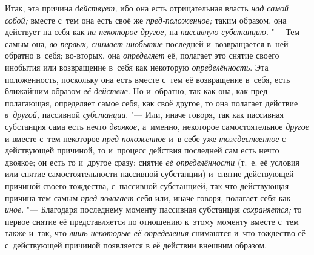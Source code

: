 Итак, эта причина {\em действует,} ибо она есть отрицательная власть
{\em над самой собой;} вместе с~тем она есть своё же {\em пред-положенное;}
таким образом, она действует на себя как {\em на некоторое другое,} на
{\em пассивную субстанцию}. "--- Тем самым она,
{\em во-первых, снимает инобытие} последней и~возвращается в~ней обратно
в~себя; во-вторых, она {\em определяет} её, полагает это снятие своего инобытия
или возвращение в~себя как некоторую {\em определённость}. Эта положенность,
поскольку она есть вместе с~тем её возвращение в~себя, есть ближайшим образом
{\em её действие}. Но и~обратно, так как она, как пред-полагающая, определяет
самое себя, как своё другое, то она полагает действие {\em в~другой,} пассивной
{\em субстанции}. "--- Или, иначе говоря, так как пассивная субстанция сама
есть нечто {\em двоякое,} а~именно, некоторое самостоятельное {\em другое} и
вместе с~тем некоторое {\em пред-положенное} и~в себе уже {\em тождественное}
с действующей причиной, то и~процесс действия последней сам есть нечто двоякое;
он есть то и~другое сразу: снятие {\em её определённости} (т.~е. её условия или
снятие самостоятельности пассивной субстанции) и~снятие действующей причиной
своего тождества, с~пассивной субстанцией, так что действующая причина тем
самым {\em пред-полагает} себя или, иначе говоря, полагает себя как
{\em иное}. "--- Благодаря последнему моменту пассивная субстанция
{\em сохраняется;} то первое снятие её представляется по отношению к~этому
моменту вместе с~тем также и~так, что {\em лишь некоторые её определения}
снимаются и~что тождество её с~действующей причиной появляется
в её действии внешним образом.

